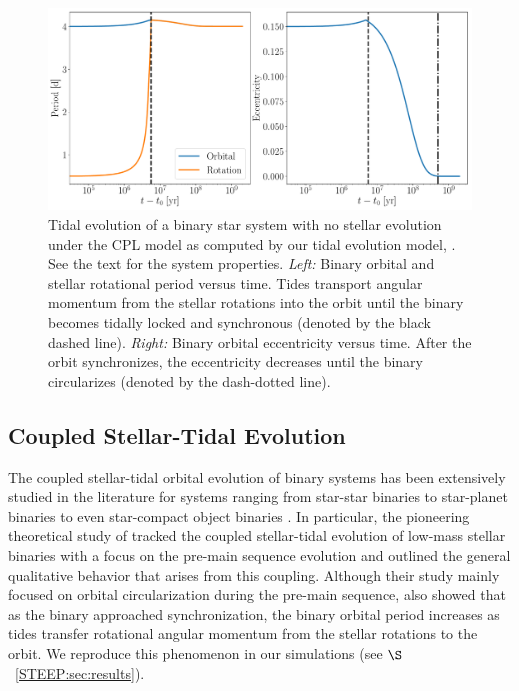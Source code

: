 \begin{figure}
	\includegraphics[width=\textwidth]{eqtide_example.pdf}
    \caption{Tidal evolution of a binary star system with no stellar evolution under the CPL model \citep{FerrazMello2008,Heller2011} as computed by our tidal evolution model, \eqtide.  See the text for the system properties. {\it Left:} Binary orbital and stellar rotational period versus time.  Tides transport angular momentum from the stellar rotations into the orbit until the binary becomes tidally locked and synchronous (denoted by the black dashed line).  {\it Right:} Binary orbital eccentricity versus time.  After the orbit synchronizes, the eccentricity decreases until the binary circularizes (denoted by the dash-dotted line).}
    \label{STEEP:fig:eqtide_example}
\end{figure}


\subsection{Coupled Stellar-Tidal Evolution} \label{STEEP:sec:coupled_evolution} 

The coupled stellar-tidal orbital evolution of binary systems has been extensively studied in the literature for systems ranging from star-star binaries \citep[e.g.][]{Huang1966,Mestel1968,VantVeer1988,Zahn1989,Li1998,Khaliullin2011} to star-planet binaries \cite[e.g.][]{DobbsDixon2004,Barker2009,Lanza2016} to even star-compact object binaries \citep[e.g.][]{Verbunt1981,Repetto2014}.  In particular, the pioneering theoretical study of \citet{Zahn1989} tracked the coupled stellar-tidal evolution of low-mass stellar binaries with a focus on the pre-main sequence evolution and outlined the general qualitative behavior that arises from this coupling.  Although their study mainly focused on orbital circularization during the pre-main sequence, \citet{Zahn1989} also showed that as the binary approached synchronization, the binary orbital period increases as tides transfer rotational angular momentum from the stellar rotations to the orbit.  We reproduce this phenomenon in our simulations (see $\S$~\ref{STEEP:sec:results}).

